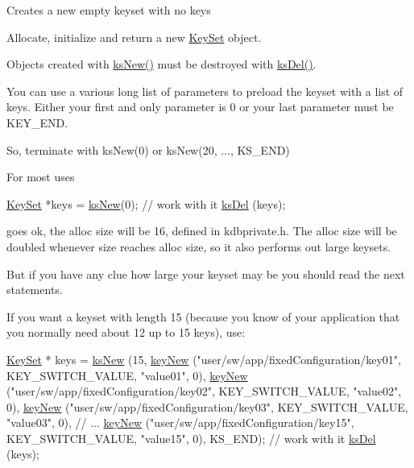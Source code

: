 Creates a new empty keyset with no keys

Allocate, initialize and return a new \hyperlink{classkdb_1_1KeySet}{Key\-Set} object.

Objects created with \hyperlink{group__keyset_ga671e1aaee3ae9dc13b4834a4ddbd2c3c}{ks\-New()} must be destroyed with \hyperlink{group__keyset_ga27e5c16473b02a422238c8d970db7ac8}{ks\-Del()}.

You can use a various long list of parameters to preload the keyset with a list of keys. Either your first and only parameter is 0 or your last parameter must be K\-E\-Y\-\_\-\-E\-N\-D.

So, terminate with ks\-New(0) or ks\-New(20, ..., K\-S\-\_\-\-E\-N\-D)

For most uses 
\begin{DoxyCode}
\hyperlink{classkdb_1_1KeySet_a4eac9850fa4f06c07a5306befc3e4377}{KeySet} *keys = \hyperlink{group__keyset_ga671e1aaee3ae9dc13b4834a4ddbd2c3c}{ksNew}(0);
\textcolor{comment}{// work with it}
\hyperlink{group__keyset_ga27e5c16473b02a422238c8d970db7ac8}{ksDel} (keys);
\end{DoxyCode}
 goes ok, the alloc size will be 16, defined in kdbprivate.\-h. The alloc size will be doubled whenever size reaches alloc size, so it also performs out large keysets.

But if you have any clue how large your keyset may be you should read the next statements.

If you want a keyset with length 15 (because you know of your application that you normally need about 12 up to 15 keys), use\-: 
\begin{DoxyCode}
\hyperlink{classkdb_1_1KeySet_a4eac9850fa4f06c07a5306befc3e4377}{KeySet} * keys = \hyperlink{group__keyset_ga671e1aaee3ae9dc13b4834a4ddbd2c3c}{ksNew} (15,
        \hyperlink{group__key_gaf6893c038b3ebee90c73a9ea8356bebf}{keyNew} (\textcolor{stringliteral}{"user/sw/app/fixedConfiguration/key01"}, KEY\_SWITCH\_VALUE,
       \textcolor{stringliteral}{"value01"}, 0),
        \hyperlink{group__key_gaf6893c038b3ebee90c73a9ea8356bebf}{keyNew} (\textcolor{stringliteral}{"user/sw/app/fixedConfiguration/key02"}, KEY\_SWITCH\_VALUE,
       \textcolor{stringliteral}{"value02"}, 0),
        \hyperlink{group__key_gaf6893c038b3ebee90c73a9ea8356bebf}{keyNew} (\textcolor{stringliteral}{"user/sw/app/fixedConfiguration/key03"}, KEY\_SWITCH\_VALUE,
       \textcolor{stringliteral}{"value03"}, 0),
        \textcolor{comment}{// ...}
        \hyperlink{group__key_gaf6893c038b3ebee90c73a9ea8356bebf}{keyNew} (\textcolor{stringliteral}{"user/sw/app/fixedConfiguration/key15"}, KEY\_SWITCH\_VALUE,
       \textcolor{stringliteral}{"value15"}, 0),
        KS\_END);
\textcolor{comment}{// work with it}
\hyperlink{group__keyset_ga27e5c16473b02a422238c8d970db7ac8}{ksDel} (keys);
\end{DoxyCode}


